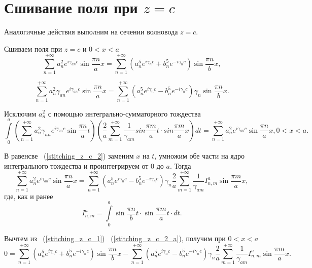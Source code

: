 \chapter{Сшивание поля при $z=c$}

Аналогичные действия выполним на сечении волновода $z = c$.

Сшиваем поля при $z = c$ и $0 < x < a$
\begin{equation}
	\label{stitching_z_c_1}
	\sum\limits_{n=1}^{+\infty}a_n^2e^{i\gamma_{an}c}\sin{\frac{\pi n}{a}x} = \sum\limits_{n=1}^{+\infty}\left(a_n^5e^{i\gamma_{n}c}+b_n^5e^{-i\gamma_{n}c}\right)\sin{\frac{\pi n}{b}x},
\end{equation}

\begin{equation}
	\label{stitching_z_c_2}
	\sum\limits_{n=1}^{+\infty}a_n^2\gamma_{an}e^{i\gamma_{an}c}\sin{\frac{\pi n}{a}x} = \sum\limits_{n=1}^{+\infty}\left(a_n^5e^{i\gamma_{n}c}-b_n^5e^{-i\gamma_{n}c}\right)\gamma_{n}\sin{\frac{\pi n}{b}x}.
\end{equation}

Исключим $a_n^2$ с помощью интегрально-сумматорного тождества
$$
	\int\limits_0^a\left(\sum\limits_{n=1}^{+\infty}a_n^2\gamma_{an}e^{i\gamma_{an}c}\sin{\frac{\pi n}{a}t}\right)\left(\frac{2}{a}\sum\limits_{m=1}^{+\infty}\frac{1}{\gamma_{am}}sin{\frac{\pi m}{a}t} \cdot sin{\frac{\pi m}{a}x}\right)dt = \sum\limits_{n=1}^{+\infty}a_n^2e^{i\gamma_{an}c}\sin{\frac{\pi n}{a}x}, 0 < x < a.
$$

В равенсве ~(\ref{stitching_z_c_2}) заменим $x$ на $t$, умножим обе части на ядро интегрального тождества и проинтегрируем от $0$ до $a$. Тогда
\begin{equation}
	\label{stitching_z_c_2_a}
	\sum\limits_{n=1}^{+\infty}a_n^2e^{i\gamma_{an}c}\sin{\frac{\pi n}{a}x} = \sum\limits_{n=1}^{+\infty}\left(a_n^5e^{i\gamma_{n}c}-b_n^5e^{-i\gamma_{n}c}\right)\gamma_{n}\frac{2}{a}\sum\limits_{m=1}^{+\infty}\frac{1}{\gamma_{am}}I_{n,m}^a\sin{\frac{\pi m}{a}x},
\end{equation}
где, как и ранее
$$
	I_{n,m}^a = \int\limits_0^a\sin{\frac{\pi n}{b}t} \cdot \sin{\frac{\pi m}{a}t} \cdot dt.
$$

Вычтем из ~(\ref{stitching_z_c_1}) ~(\ref{stitching_z_c_2_a}), получим при $0 < x < a$
\begin{equation}
	\label{stitching_z_c_3}
	0 = \sum\limits_{n=1}^{+\infty}\left(a_n^5e^{i\gamma_{n}c}+b_n^5e^{-i\gamma_{n}c}\right)\sin{\frac{\pi n}{b}x} - \sum\limits_{n=1}^{+\infty}\left(a_n^5e^{i\gamma_{n}c}-b_n^5e^{-i\gamma_{n}c}\right)\gamma_{n}\frac{2}{a}\sum\limits_{m=1}^{+\infty}\frac{1}{\gamma_{am}}I_{n,m}^a\sin{\frac{\pi m}{a}x}.
\end{equation}

